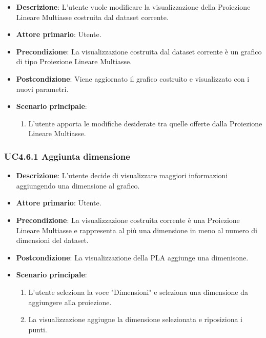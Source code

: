 \begin{itemize}
    \item \textbf{Descrizione}: L’utente vuole modificare la visualizzazione della Proiezione Lineare Multiasse
                                costruita dal dataset corrente.
	
    \item \textbf{Attore primario}: Utente.
    
    \item \textbf{Precondizione}:   La visualizzazione costruita dal dataset corrente è un grafico di tipo Proiezione Lineare Multiasse.
    \item \textbf{Postcondizione}:  Viene aggiornato il grafico costruito e visualizzato con i nuovi parametri.

	\item \textbf{Scenario principale}:
		\begin{enumerate}
            \item L'utente apporta le modifiche desiderate tra quelle offerte dalla Proiezione Lineare Multiasse.
        \end{enumerate}
\end{itemize}

\subsubsection{UC4.6.1 Aggiunta dimensione}
\label{ssub:uc4.6.1}
\begin{itemize}
    \item \textbf{Descrizione}: L’utente decide di visualizzare maggiori informazioni
                                aggiungendo una dimensione al grafico.

    \item \textbf{Attore primario}: Utente.
    
    \item \textbf{Precondizione}:   La visualizzazione costruita corrente è una Proiezione Lineare Multiasse
                                    e rappresenta al più una dimensione in meno al numero di dimensioni del dataset.
    \item \textbf{Postcondizione}:  La visualizzazione della PLA aggiunge una dimenisone.

	\item \textbf{Scenario principale}:
        \begin{enumerate}
            \item L'utente seleziona la voce "Dimensioni" e seleziona una dimensione da aggiungere alla proiezione.
            \item La visualizzazione aggiugne la dimensione selezionata e riposiziona i punti.
           
        \end{enumerate}
\end{itemize}

